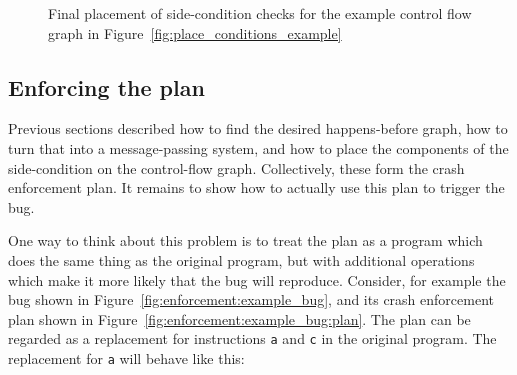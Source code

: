 \begin{figure}
  \caption{Final placement of side-condition checks for the example
    control flow graph in Figure~\ref{fig:place_conditions_example}}
  \label{fig:place_conditions_example:result}
\end{figure}

\subsection{Enforcing the plan}
\label{sect:enforce:interpreting}

Previous sections described how to find the desired happens-before
graph, how to turn that into a message-passing system, and how to
place the components of the side-condition on the control-flow graph.
Collectively, these form the crash enforcement plan.  It remains to
show how to actually use this plan to trigger the bug.

One way to think about this problem is to treat the plan as a program
which does the same thing as the original program, but with additional
operations which make it more likely that the bug will reproduce.
Consider, for example the bug shown in
Figure~\ref{fig:enforcement:example_bug}, and its crash enforcement
plan shown in Figure~\ref{fig:enforcement:example_bug:plan}.  The plan
can be regarded as a replacement for instructions {\tt a} and {\tt c}
in the original program.  The replacement for {\tt a} will behave like
this:

